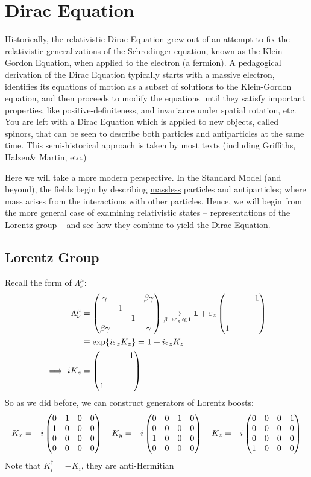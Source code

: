 \newcommand{\sla}[1]{\slashed{#1}}
\newcommand{\slap}{\slashed{p}}
\section{Dirac Equation}
Historically, the relativistic Dirac Equation grew out of an attempt to fix the relativistic generalizations of the Schrodinger equation, known as the Klein-Gordon Equation, when applied to the electron (a fermion). A pedagogical derivation of the Dirac Equation typically starts with a massive electron, identifies its equations of motion as a subset of solutions to the Klein-Gordon equation, and then proceeds to modify the equations until they satisfy important properties, like positive-definiteness, and invariance under spatial rotation, etc. You are left with a Dirac Equation which is applied to new objects, called spinors, that can be seen to describe both particles and antiparticles at the same time. This semi-historical approach is taken by most texts (including Griffiths, Halzen\& Martin, etc.)

Here we will take a more modern perspective. In the Standard Model (and beyond), the fields begin by describing \underline{massless} particles and antiparticles; where mass arises from the interactions with other particles. Hence, we will begin from the more general case of examining relativistic states -- representations of the Lorentz group -- and see how they combine to yield the Dirac Equation.

\subsection{Lorentz Group}
Recall the form of $\Lambda^\mu_\nu$:
\begin{align*}
  \Lambda^\mu_\nu&=\pmqty{\gamma&&&\beta\gamma\\&1\\&&1\\\beta\gamma&&&\gamma}
  \underset{\beta\to\veps_z\ll 1}{\to}\bm{1}+\veps_z\pmqty{&&&1\\ \\ \\ 1}\\
  &\equiv\exp{i\veps_zK_z}=\bm{1}+i\veps_zK_z\\
  \implies iK_z&=\pmqty{&&&1\\ \\ \\1}
\end{align*}
So as we did before, we can construct generators of Lorentz boosts:
\begin{align*}
  K_x=-i\pmqty{0&1&0&0\\1&0&0&0\\0&0&0&0\\0&0&0&0}\quad
  K_y=-i\pmqty{0&0&1&0\\0&0&0&0\\1&0&0&0\\0&0&0&0}\quad
  K_z=-i\pmqty{0&0&0&1\\0&0&0&0\\0&0&0&0\\1&0&0&0}
\end{align*}
Note that $K^\dag_i=-K_i$, they are anti-Hermitian

